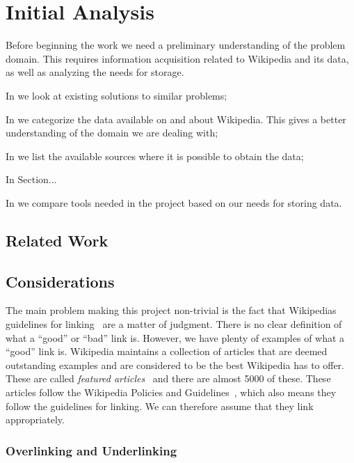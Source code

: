 \chapter{Initial Analysis}\label{chap:analysis}
Before beginning the work we need a preliminary understanding of the problem domain. This requires information acquisition related to Wikipedia and its data, as well as analyzing the needs for storage.

\begin{chapterorganization}
  \item In  we look at existing solutions to similar problems;
  \item In  we categorize the data available on and about Wikipedia. This gives a better understanding of the domain we are dealing with;
  \item In  we list the available sources where it is possible to obtain the data;
  \item In Section...
  \item In  we compare tools needed in the project based on our needs for storing data.
\end{chapterorganization}

\section{Related Work}\label{sec:related_work}
\dummy

\section{Considerations}
The main problem making this project non-trivial is the fact that Wikipedias guidelines for linking~\cite{wiki-manual-of-style-overlinking} are a matter of judgment. There is no clear definition of what a ``good'' or ``bad'' link is. However, we have plenty of examples of what a ``good'' link is.
Wikipedia maintains a collection of articles that are deemed outstanding examples and are considered to be the best Wikipedia has to offer. These are called \emph{featured articles}~\cite{wiki-featured-articles} and there are almost 5000 of these. These articles follow the Wikipedia Policies and Guidelines~\cite{wiki-editor-guidelines}, which also means they follow the guidelines for linking. We can therefore assume that they link appropriately.

\subsection{Overlinking and Underlinking}

